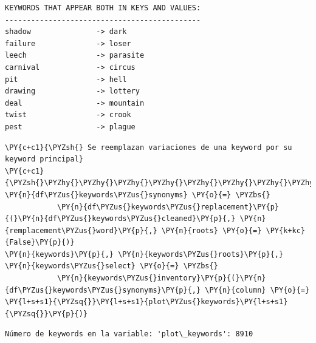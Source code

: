    \begin{Verbatim}[commandchars=\\\{\}]
KEYWORDS THAT APPEAR BOTH IN KEYS AND VALUES:
---------------------------------------------
shadow               -> dark
failure              -> loser
leech                -> parasite
carnival             -> circus
pit                  -> hell
drawing              -> lottery
deal                 -> mountain
twist                -> crook
pest                 -> plague
\end{Verbatim}

    \begin{tcolorbox}[breakable, size=fbox, boxrule=1pt, pad at break*=1mm,colback=cellbackground, colframe=cellborder]
\begin{Verbatim}[commandchars=\\\{\}]
\PY{c+c1}{\PYZsh{} Se reemplazan variaciones de una keyword por su keyword principal}
\PY{c+c1}{\PYZsh{}\PYZhy{}\PYZhy{}\PYZhy{}\PYZhy{}\PYZhy{}\PYZhy{}\PYZhy{}\PYZhy{}\PYZhy{}\PYZhy{}\PYZhy{}\PYZhy{}\PYZhy{}\PYZhy{}\PYZhy{}\PYZhy{}\PYZhy{}\PYZhy{}\PYZhy{}\PYZhy{}\PYZhy{}\PYZhy{}\PYZhy{}\PYZhy{}\PYZhy{}\PYZhy{}\PYZhy{}\PYZhy{}\PYZhy{}\PYZhy{}\PYZhy{}\PYZhy{}\PYZhy{}\PYZhy{}\PYZhy{}\PYZhy{}\PYZhy{}\PYZhy{}\PYZhy{}\PYZhy{}\PYZhy{}\PYZhy{}\PYZhy{}\PYZhy{}\PYZhy{}\PYZhy{}\PYZhy{}\PYZhy{}\PYZhy{}\PYZhy{}\PYZhy{}\PYZhy{}\PYZhy{}\PYZhy{}\PYZhy{}\PYZhy{}\PYZhy{}\PYZhy{}}
\PY{n}{df\PYZus{}keywords\PYZus{}synonyms} \PY{o}{=} \PYZbs{}
            \PY{n}{df\PYZus{}keywords\PYZus{}replacement}\PY{p}{(}\PY{n}{df\PYZus{}keywords\PYZus{}cleaned}\PY{p}{,} \PY{n}{remplacement\PYZus{}word}\PY{p}{,} \PY{n}{roots} \PY{o}{=} \PY{k+kc}{False}\PY{p}{)}   
\PY{n}{keywords}\PY{p}{,} \PY{n}{keywords\PYZus{}roots}\PY{p}{,} \PY{n}{keywords\PYZus{}select} \PY{o}{=} \PYZbs{}
            \PY{n}{keywords\PYZus{}inventory}\PY{p}{(}\PY{n}{df\PYZus{}keywords\PYZus{}synonyms}\PY{p}{,} \PY{n}{column} \PY{o}{=} \PY{l+s+s1}{\PYZsq{}}\PY{l+s+s1}{plot\PYZus{}keywords}\PY{l+s+s1}{\PYZsq{}}\PY{p}{)}
\end{Verbatim}
\end{tcolorbox}

    \begin{Verbatim}[commandchars=\\\{\}]
Número de keywords en la variable: 'plot\_keywords': 8910
\end{Verbatim}

